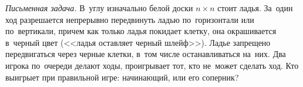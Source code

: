\begin{problems}
\item
\emph{Письменная задача.}
В~углу изначально белой доски $n \times n$ стоит ладья.
За~один ход разрешается непрерывно передвинуть ладью по~горизонтали или
по~вертикали, причем как только ладья покидает клетку, она окрашивается
в~черный цвет (<<ладья оставляет черный шлейф>>).
Ладье запрещено передвигаться через черные клетки, в~том числе останавливаться
на~них.
Два игрока по~очереди делают ходы, проигрывает тот, кто не~может сделать ход.
Кто выигрыет при правильной игре: начинающий, или его соперник?


\end{problems}

